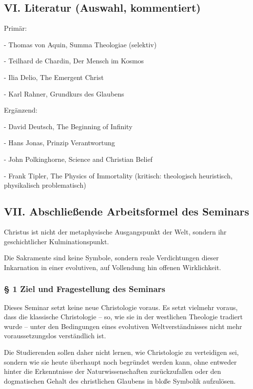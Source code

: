 \documentclass[
  ngerman,
]{article}
\begin{document}
\subsection{VI. Literatur (Auswahl,
kommentiert)}\label{vi.-literatur-auswahl-kommentiert}

Primär:

- Thomas von Aquin, Summa Theologiae (selektiv)

- Teilhard de Chardin, Der Mensch im Kosmos

- Ilia Delio, The Emergent Christ

- Karl Rahner, Grundkurs des Glaubens

Ergänzend:

- David Deutsch, The Beginning of Infinity

- Hans Jonas, Prinzip Verantwortung

- John Polkinghorne, Science and Christian Belief

- Frank Tipler, The Physics of Immortality (kritisch: theologisch
heuristisch, physikalisch problematisch)

\subsection{VII. Abschließende Arbeitsformel des
Seminars}\label{vii.-abschlieuxdfende-arbeitsformel-des-seminars}

Christus ist nicht der metaphysische Ausgangspunkt der Welt, sondern ihr
geschichtlicher Kulminationspunkt.

Die Sakramente sind keine Symbole, sondern reale Verdichtungen dieser
Inkarnation in einer evolutiven, auf Vollendung hin offenen
Wirklichkeit.

\subsubsection{§ 1 Ziel und Fragestellung des
Seminars}\label{ziel-und-fragestellung-des-seminars}

Dieses Seminar setzt keine neue Christologie voraus. Es setzt vielmehr
voraus, dass die klassische Christologie -- so, wie sie in der
westlichen Theologie tradiert wurde -- unter den Bedingungen eines
evolutiven Weltverständnisses nicht mehr voraussetzungslos verständlich
ist.

Die Studierenden sollen daher nicht lernen, wie Christologie zu
verteidigen sei, sondern wie sie heute überhaupt noch begründet werden
kann, ohne entweder hinter die Erkenntnisse der Naturwissenschaften
zurückzufallen oder den dogmatischen Gehalt des christlichen Glaubens in
bloße Symbolik aufzulösen.
\end{document}
